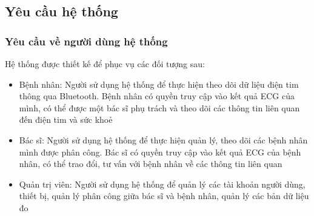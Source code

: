\subsection{Yêu cầu hệ thống}
\subsubsection{Yêu cầu về người dùng hệ thống}
Hệ thống được thiết kế để phục vụ các đối tượng sau:
\begin{adjustwidth}{1.5em}{}
\begin{itemize}
    \item Bệnh nhân: Người sử dụng hệ thống để thực hiện theo dõi dữ liệu điện tim thông qua Bluetooth. Bệnh nhân có quyền truy cập vào kết quả ECG của mình, có thể được một bác sĩ phụ trách và theo dõi các thông tin liên quan đến điện tim và sức khoẻ
    \item Bác sĩ: Người sử dụng hệ thống để thực hiện quản lý, theo dõi các bệnh nhân mình được phân công. Bác sĩ có quyền truy cập vào kết quả ECG của bệnh nhân, có thể trao đổi, tư vấn với bệnh nhân về các thông tin liên quan
    \item Quản trị viên: Người sử dụng hệ thống để quản lý các tài khoản người dùng, thiết bị, quản lý phân công giữa bác sĩ và bệnh nhân, quản lý các bản dữ liệu đo
\end{itemize}
\end{adjustwidth}

